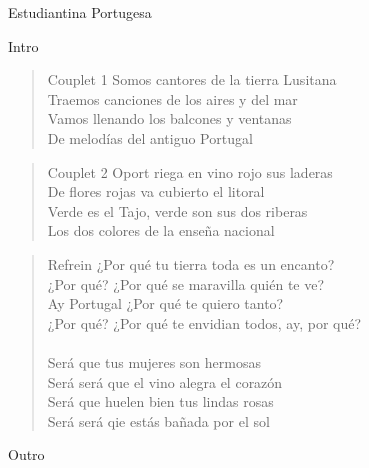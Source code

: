 \begin{song}{Estudiantina Portugesa}

\begin{instrumental}{Intro}
 \measure{} \measure{} \measure{} \measure{} \measure{} \measure{} \measure{}
\measure{} \measure{} \measure{} \measure{}  \measure{} \measure{} \measure{}
\measure{} \measure{} \measure{} \measure{} \measure{} \measure{} \measure{} \measure{}
\measure{} \measure{} \measure{} \measure{}  
\end{instrumental}

\begin{verse}{Couplet 1}
    Somos cantores de la tierra Lusitana\\
    Traemos canciones de los aires y del mar\\
    Vamos llenando los balcones y ventanas\\
    De melod\'ias del antiguo Portugal
\end{verse}

\begin{verse}{Couplet 2}
    Oport riega en vino rojo sus laderas\\
    De flores rojas va cubierto el litoral\\
    Verde es el Tajo, verde son sus dos riberas\\
    Los dos colores de la ense\~na nacional
\end{verse}

\begin{verse}{Refrein}
    ¿Por qu\'e tu tierra toda es un encanto?\\
    ¿Por qu\'e? ¿Por qu\'e se maravilla qui\'en te ve?\\
    Ay Portugal ¿Por qu\'e te quiero tanto?\\
    ¿Por qu\'e? ¿Por qu\'e te envidian todos, ay, por qu\'e?\\
    \\
    Ser\'a que tus mujeres son hermosas\\
    Ser\'a ser\'a que el vino alegra el coraz\'on\\
    Ser\'a que huelen bien tus lindas rosas\\
    Ser\'a ser\'a qie est\'as ba\~nada por el sol
\end{verse}

\begin{instrumental}{Outro}
    \measure{}  \measure{}  \measure{}  \measure{} 
\end{instrumental}
\end{song}
